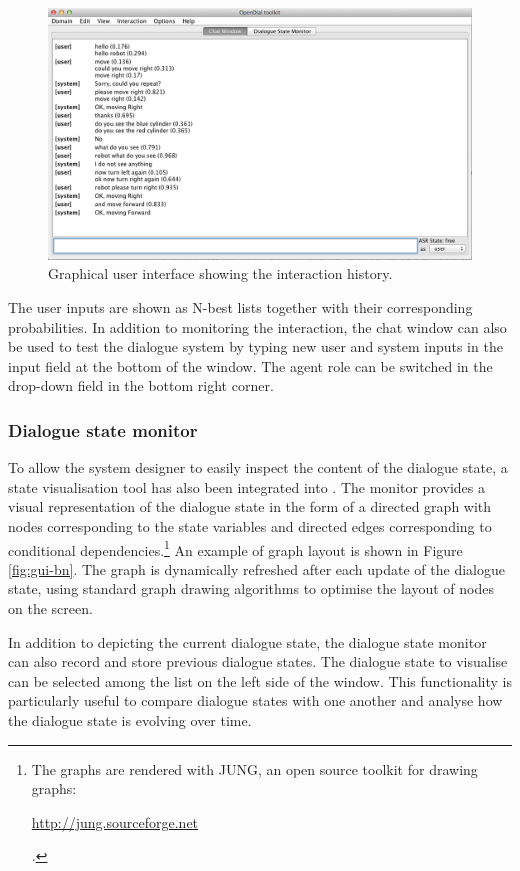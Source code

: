 \begin{figure}[h]
\centering
\includegraphics[scale=0.40]{imgs/gui-chatbox.png}
\caption{Graphical user interface showing the interaction history.}
\label{fig:gui-chatbox}
\end{figure}

  The user inputs are shown as N-best lists together with their corresponding probabilities. 
In addition to monitoring the interaction, the chat window can also be used to test the dialogue system by typing new user and system inputs in the input field at the bottom of the window.  The agent role can be switched in the drop-down field in the bottom right corner. 


\subsubsection*{Dialogue state monitor}

To allow the system designer to easily inspect the content of the dialogue state, a state visualisation tool has also been integrated into \opendial .  The monitor provides a visual representation of the dialogue state in the form of a directed graph with nodes corresponding to the state variables and directed edges corresponding to conditional dependencies.\footnote{The graphs are rendered with JUNG, an open source toolkit for drawing graphs: \begin{scriptsize}\url{http://jung.sourceforge.net}\end{scriptsize}.} An example of graph layout is shown in Figure \ref{fig:gui-bn}. The graph is dynamically refreshed after each update of the dialogue state, using standard graph drawing algorithms to optimise the layout of nodes on the screen. 

In addition to depicting the current dialogue state, the dialogue state monitor can also record and store previous dialogue states.  The dialogue state to visualise can be selected among the list on the left side of the window. This functionality is particularly useful to compare dialogue states with one another and analyse how the dialogue state is evolving over time. 

